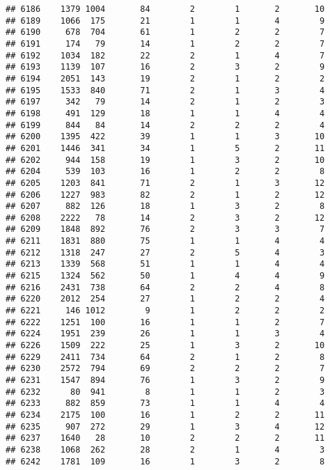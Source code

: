 \documentclass[]{article}
\begin{document}
\begin{verbatim}
## 6186    1379 1004       84        2        1       2       10
## 6189    1066  175       21        1        1       4        9
## 6190     678  704       61        1        2       2        7
## 6191     174   79       14        1        2       2        7
## 6192    1034  182       22        2        1       4        7
## 6193    1139  107       16        2        3       2        9
## 6194    2051  143       19        2        1       2        2
## 6195    1533  840       71        2        1       3        4
## 6197     342   79       14        2        1       2        3
## 6198     491  129       18        1        1       4        4
## 6199     844   84       14        2        2       2        4
## 6200    1395  422       39        1        1       3       10
## 6201    1446  341       34        1        5       2       11
## 6202     944  158       19        1        3       2       10
## 6204     539  103       16        1        2       2        8
## 6205    1203  841       71        2        1       3       12
## 6206    1227  983       82        2        1       2       12
## 6207     882  126       18        1        3       2        8
## 6208    2222   78       14        2        3       2       12
## 6209    1848  892       76        2        3       3        7
## 6211    1831  880       75        1        1       4        4
## 6212    1318  247       27        2        5       4        3
## 6213    1339  568       51        1        1       4        4
## 6215    1324  562       50        1        4       4        9
## 6216    2431  738       64        2        2       4        8
## 6220    2012  254       27        1        2       2        4
## 6221     146 1012        9        1        2       2        2
## 6222    1251  100       16        1        1       2        7
## 6224    1951  239       26        1        1       3        4
## 6226    1509  222       25        1        3       2       10
## 6229    2411  734       64        2        1       2        8
## 6230    2572  794       69        2        2       2        7
## 6231    1547  894       76        1        3       2        9
## 6232      80  941        8        1        1       2        3
## 6233     882  859       73        1        1       4        4
## 6234    2175  100       16        1        2       2       11
## 6235     907  272       29        1        3       4       12
## 6237    1640   28       10        2        2       2       11
## 6238    1068  262       28        2        1       4        3
## 6242    1781  109       16        1        3       2        8

\end{verbatim}
\end{document}
